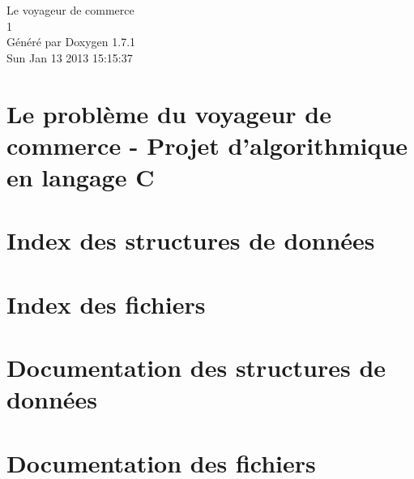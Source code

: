 \documentclass[a4paper]{book}
\begin{document}
\hypersetup{pageanchor=false}
\begin{titlepage}
\vspace*{7cm}
\begin{center}
{\Large Le voyageur de commerce \\[1ex]\large 1 }\\
\vspace*{1cm}
{\large Généré par Doxygen 1.7.1}\\
\vspace*{0.5cm}
{\small Sun Jan 13 2013 15:15:37}\\
\end{center}
\end{titlepage}
\clearemptydoublepage
{}
\tableofcontents
\clearemptydoublepage
{}
\hypersetup{pageanchor=true}
\chapter{Le problème du voyageur de commerce -\/ Projet d'algorithmique en langage C}
\label{index}\hypertarget{index}{}
\chapter{Index des structures de données}

\chapter{Index des fichiers}

\chapter{Documentation des structures de données}







\chapter{Documentation des fichiers}






















\printindex
\end{document}
